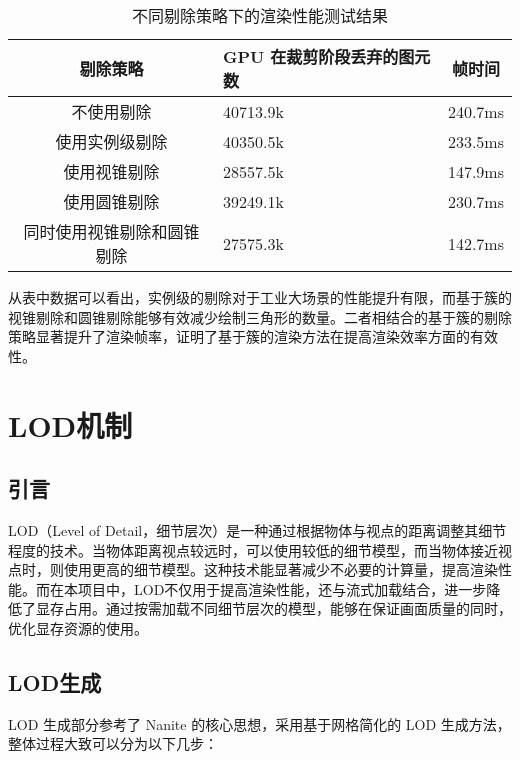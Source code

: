 \begin{table}[H]
    \caption{\label{tab:culling}不同剔除策略下的渲染性能测试结果}
    \begin{tabularx}{\linewidth}{|c|X<{\centering}|c|}
        \hline
        剔除策略 & GPU 在裁剪阶段丢弃的图元数 & 帧时间 \\ \hline
        不使用剔除 & 40713.9k & 240.7ms \\ \hline
        使用实例级剔除 & 40350.5k & 233.5ms \\ \hline
        使用视锥剔除 & 28557.5k & 147.9ms \\ \hline
        使用圆锥剔除 & 39249.1k & 230.7ms \\ \hline
        同时使用视锥剔除和圆锥剔除 & 27575.3k & 142.7ms \\ \hline
    \end{tabularx}
\end{table}

从表中数据可以看出，实例级的剔除对于工业大场景的性能提升有限，而基于簇的视锥剔除和圆锥剔除能够有效减少绘制三角形的数量。二者相结合的基于簇的剔除策略显著提升了渲染帧率，证明了基于簇的渲染方法在提高渲染效率方面的有效性。

\section{LOD机制}

\subsection{引言}

LOD（Level of Detail，细节层次）是一种通过根据物体与视点的距离调整其细节程度的技术。当物体距离视点较远时，可以使用较低的细节模型，而当物体接近视点时，则使用更高的细节模型。这种技术能显著减少不必要的计算量，提高渲染性能\cite{Deng2017}。而在本项目中，LOD不仅用于提高渲染性能，还与流式加载结合，进一步降低了显存占用。通过按需加载不同细节层次的模型，能够在保证画面质量的同时，优化显存资源的使用。

\subsection{LOD生成} \label{subsec:LOD generation}

LOD 生成部分参考了 Nanite 的核心思想，采用基于网格简化的 LOD 生成方法\cite{Jensen2023}，整体过程大致可以分为以下几步\cite{Xavier2024}：

\newcommand{\stepref}[1]{\textbf{Step~\ref{#1}}}

